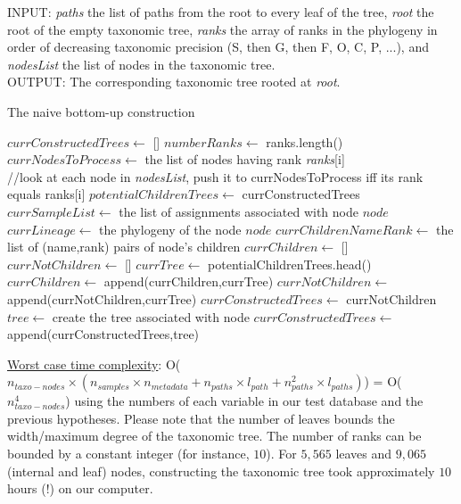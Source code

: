 \documentclass{report}
\begin{document}
\textsc{INPUT:} \emph{paths} the list of paths from the root to every leaf of the tree, \emph{root} the root of the empty taxonomic tree, \emph{ranks} the array of ranks in the phylogeny in order of decreasing taxonomic precision (S, then G, then F, O, C, P, ...), and \emph{nodesList} the list of nodes in the taxonomic tree.\\

\textsc{OUTPUT:} The corresponding taxonomic tree rooted at \emph{root}.\\

\begin{algorithm}
\caption{The naive bottom-up construction}
\begin{algorithmic}
\STATE $currConstructedTrees \leftarrow$ []
\STATE $numberRanks \leftarrow$ ranks.length()
\STATE $currNodesToProcess \leftarrow$ the list of nodes having rank \emph{ranks}[i]\\ //look at each node in \emph{nodesList}, push it to currNodesToProcess iff its rank equals ranks[i]
\STATE $potentialChildrenTrees \leftarrow$ currConstructedTrees
\STATE $currSampleList \leftarrow$ the list of assignments associated with node $node$
\STATE $currLineage \leftarrow$ the phylogeny of the node $node$
\STATE $currChildrenNameRank \leftarrow$ the list of (name,rank) pairs of node's children
\STATE $currChildren \leftarrow$ []
\STATE $currNotChildren \leftarrow$ []
\STATE $currTree \leftarrow$ potentialChildrenTrees.head()
\STATE $currChildren \leftarrow$ append(currChildren,currTree)
\ELSE
\STATE $currNotChildren \leftarrow$ append(currNotChildren,currTree)
\ENDIF
\STATE $currConstructedTrees \leftarrow$ currNotChildren
\STATE $tree \leftarrow$ create the tree associated with node 
\STATE $currConstructedTrees \leftarrow$ append(currConstructedTrees,tree)
\ENDWHILE
\ENDFOR
\ENDFOR
{}
\end{algorithmic}
\end{algorithm}

\uline{Worst case time complexity}: O($n_{taxo-nodes} \times (n_{samples} \times n_{metadata} + n_{paths} \times l_{path} + n_{paths}^{2} \times l_{paths})$) = O($n_{taxo-nodes}^{4}$) using the numbers of each variable in our test database and the previous hypotheses. Please note that the number of leaves bounds the width/maximum degree of the taxonomic tree. The number of ranks can be bounded by a constant integer (for instance, $10$). For $5,565$ leaves and $9,065$ (internal and leaf) nodes, constructing the taxonomic tree took approximately $10$ hours (!) on our computer.\\
\end{document}
